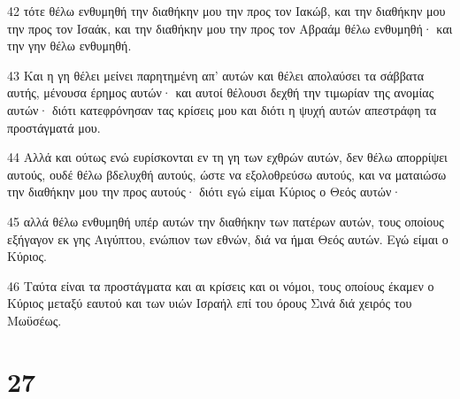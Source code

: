\par 42 τότε θέλω ενθυμηθή την διαθήκην μου την προς τον Ιακώβ, και την διαθήκην μου την προς τον Ισαάκ, και την διαθήκην μου την προς τον Αβραάμ θέλω ενθυμηθή· και την γην θέλω ενθυμηθή.
\par 43 Και η γη θέλει μείνει παρητημένη απ' αυτών και θέλει απολαύσει τα σάββατα αυτής, μένουσα έρημος αυτών· και αυτοί θέλουσι δεχθή την τιμωρίαν της ανομίας αυτών· διότι κατεφρόνησαν τας κρίσεις μου και διότι η ψυχή αυτών απεστράφη τα προστάγματά μου.
\par 44 Αλλά και ούτως ενώ ευρίσκονται εν τη γη των εχθρών αυτών, δεν θέλω απορρίψει αυτούς, ουδέ θέλω βδελυχθή αυτούς, ώστε να εξολοθρεύσω αυτούς, και να ματαιώσω την διαθήκην μου την προς αυτούς· διότι εγώ είμαι Κύριος ο Θεός αυτών·
\par 45 αλλά θέλω ενθυμηθή υπέρ αυτών την διαθήκην των πατέρων αυτών, τους οποίους εξήγαγον εκ γης Αιγύπτου, ενώπιον των εθνών, διά να ήμαι Θεός αυτών. Εγώ είμαι ο Κύριος.
\par 46 Ταύτα είναι τα προστάγματα και αι κρίσεις και οι νόμοι, τους οποίους έκαμεν ο Κύριος μεταξύ εαυτού και των υιών Ισραήλ επί του όρους Σινά διά χειρός του Μωϋσέως.

\chapter{27}

